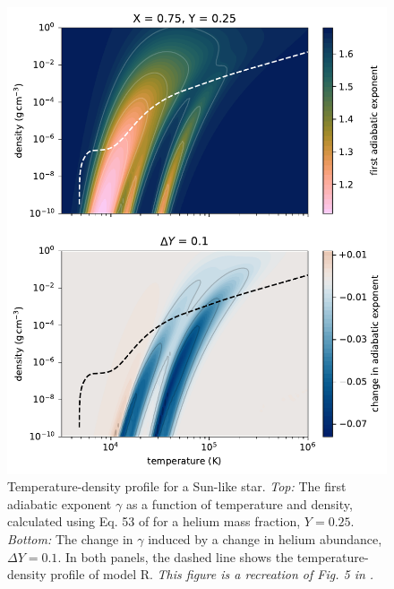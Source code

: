 \begin{figure}
    \centering
    \includegraphics{figures/adiabatic-ionisation-temp.pdf}
    \caption[Temperature-density profile for a Sun-like star.]{Temperature-density profile for a Sun-like star. \emph{Top:} The first adiabatic exponent \(\gamma\) as a function of temperature and density, calculated using Eq. 53 of \citet{Houdayer.Reese.ea2021} for a helium mass fraction, \(Y=0.25\). \emph{Bottom:} The change in \(\gamma\) induced by a change in helium abundance, \(\Delta Y = 0.1\). In both panels, the dashed line shows the temperature-density profile of model R. \emph{This figure is a recreation of Fig. 5 in \citet{Houdayer.Reese.ea2021}.}}
    \label{fig:gamma-temp-density}
\end{figure}

